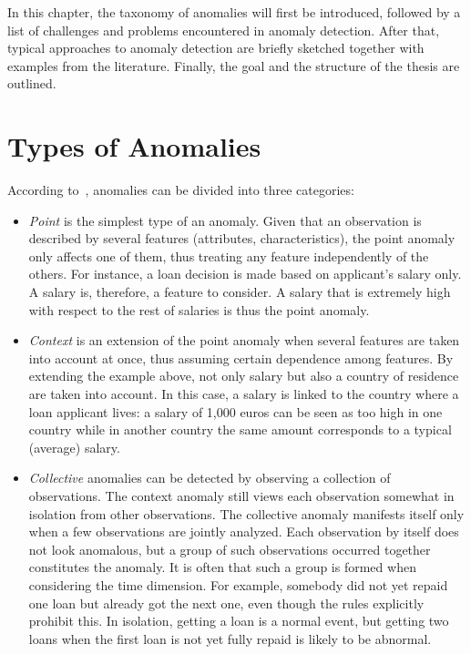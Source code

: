 
In this chapter, the taxonomy of anomalies will first be introduced, followed by a list of challenges and problems encountered in anomaly detection. After that, typical approaches to anomaly detection are briefly sketched together with examples from the literature. Finally, the goal and the structure of the thesis are outlined.

\section{Types of Anomalies}\label{taxonomyofanomalies}
According to~\cite{Chandola:2009:ADS:1541880.1541882}, anomalies can be divided into three categories:
\begin{itemize}
    \item \textit{Point} is the simplest type of an anomaly. Given that an observation is described by several features (attributes, characteristics), the point anomaly only affects one of them, thus treating any feature independently of the others. For instance, a loan decision is made based on applicant's salary only. A salary is, therefore, a feature to consider. A salary that is extremely high with respect to the rest of salaries is thus the point anomaly.

    \item \textit{Context} is an extension of the point anomaly when several features are taken into account at once, thus assuming certain dependence among features. By extending the example above, not only salary but also a country of residence are taken into account. In this case, a salary is linked to the country where a loan applicant lives: a salary of 1,000 euros can be seen as too high in one country while in another country the same amount corresponds to a typical (average) salary.

    \item \textit{Collective} anomalies can be detected by observing a collection of observations. The context anomaly still views each observation somewhat in isolation from other observations. The collective anomaly manifests itself only when a few observations are jointly analyzed. Each observation by itself does not look anomalous, but a group of such observations occurred together constitutes the anomaly. It is often that such a group is formed when considering the time dimension. For example, somebody did not yet repaid one loan but already got the next one, even though the rules explicitly prohibit this. In isolation, getting a loan is a normal event, but getting two loans when the first loan is not yet fully repaid is likely to be abnormal.
\end{itemize}

